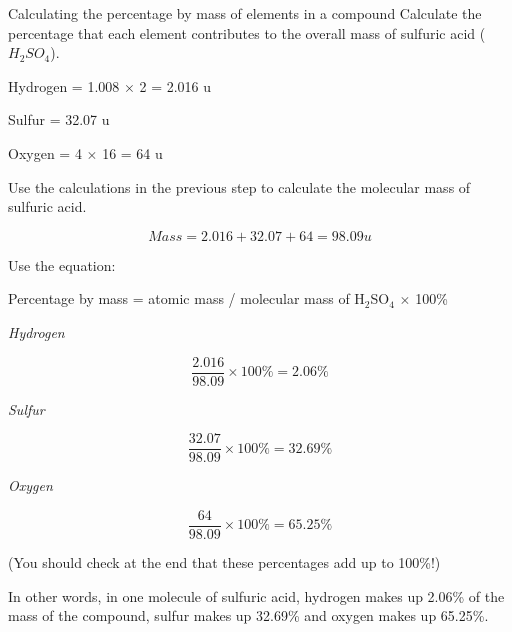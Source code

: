 \begin{wex}{Calculating the percentage by mass of elements in a compound}{
Calculate the percentage that each element contributes to the overall mass of sulfuric acid ($H_{2}SO_{4}$).\\}

{

Hydrogen = 1.008 $\times$ 2 = 2.016 u

Sulfur = 32.07 u

Oxygen = 4 $\times$ 16 = 64 u\\
}

{
Use the calculations in the previous step to calculate the molecular mass of sulfuric acid.

\begin{equation*}
Mass = 2.016 + 32.07 + 64 = 98.09 u
\end{equation*}
}


{

Use the equation:

\begin{center}
Percentage by mass = atomic mass / molecular mass of H$_{2}$SO$_{4}$ $\times$ 100\%
\end{center}


\textit{Hydrogen}

\begin{equation*}
\frac{2.016}{98.09} \times 100\% = 2.06\%
\end{equation*}

\textit{Sulfur}

\begin{equation*}
\frac{32.07}{98.09} \times 100\% = 32.69\%
\end{equation*}

\textit{Oxygen}

\begin{equation*}
\frac{64}{98.09} \times 100\% = 65.25\%
\end{equation*}


(You should check at the end that these percentages add up to 100\%!)

In other words, in one molecule of sulfuric acid, hydrogen makes up 2.06\% of the mass of the compound, sulfur makes up 32.69\% and oxygen makes up 65.25\%.
}

\end{wex}


